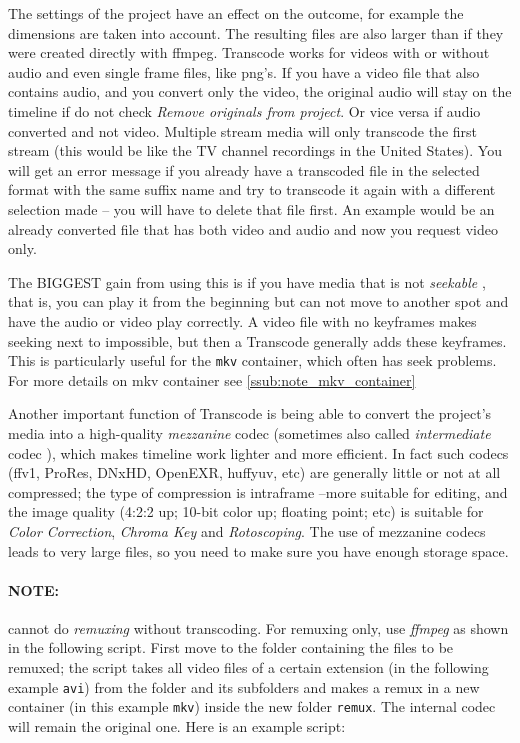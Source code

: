The settings of the project have an effect on the outcome, for example the dimensions are taken into account. The resulting files are also larger than if they were created directly with ffmpeg.
Transcode works for videos with or without audio and even single frame files, like png's.
If you have a video file that also contains audio, and you convert only the video, the original audio will stay on the timeline if do not check \textit{Remove originals from project}. Or vice versa if audio converted and not video.
Multiple stream media will only transcode the first stream (this would be like the TV channel recordings in the United States).
You will get an error message if you already have a transcoded file in the selected format with the same suffix name and try to transcode it again with a different selection made -- you will have to delete that file first. An example would be
an already converted file that has both video and audio and now you request video only. 

The BIGGEST gain from using this is if you have media that is not \textit{seekable} , that is, you can play it from the beginning but can not move to another spot and have the audio or video play correctly. A video file with no keyframes makes seeking next to impossible, but then a Transcode generally adds these keyframes. This is particularly useful for the \texttt{mkv} container, which often has seek problems. For more details on mkv container see \ref{ssub:note_mkv_container}

Another important function of Transcode is being able to convert the project's media into a high-quality \textit{mezzanine} codec  (sometimes also called \textit{intermediate} codec ), which makes timeline work lighter and more efficient. In fact such codecs (ffv1, ProRes, DNxHD, OpenEXR, huffyuv, etc) are generally little or not at all compressed; the type of compression is intraframe --more suitable for editing, and the image quality (4:2:2 up; 10-bit color up; floating point; etc) is suitable for \textit{Color Correction}, \textit{Chroma Key} and \textit{Rotoscoping}. The use of mezzanine codecs leads to very large files, so you need to make sure you have enough storage space.

\paragraph{NOTE:} \CGG{} cannot do \textit{remuxing} without transcoding. For remuxing only, use \textit{ffmpeg} as shown in the following script. First move to the folder containing the files to be remuxed; the script takes all video files of a certain extension (in the following example \texttt{avi}) from the folder and its subfolders and makes a remux in a new container (in this example \texttt{mkv}) inside the new folder \texttt{remux}. The internal codec will remain the original one.  Here is an example script:

